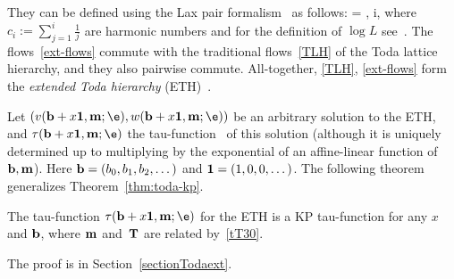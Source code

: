 They can be defined using the Lax pair formalism~\cite{CDZ} as follows:
\beq\label{ext-flows}
\e{} = , \qquad i,
\eeq
where $c_i:=\sum_{j=1}^i \frac1j$ are harmonic numbers and for the definition of $\log L$ see~\cite{CDZ, Milanov}.
The flows~\eqref{ext-flows} commute with the traditional flows~\eqref{TLH}
of the Toda lattice hierarchy, and they also pairwise commute.
All-together, \eqref{TLH}, \eqref{ext-flows} form the {\it extended Toda hierarchy} (ETH)~\cite{CDZ, Getzler, Zhang}.

Let $(v({\bf b}+x{\bf 1}, {\bf m}; \e), w({\bf b}+x{\bf 1}, {\bf m}; \e) )$ be an arbitrary solution
to the ETH, and $\tau({\bf b}+x{\bf 1},{\bf m}; \e)$ the tau-function~\cite{CDZ} of this solution
(although it is uniquely determined up to multiplying by
the exponential of an affine-linear function of ${\bf b}, {\bf m}$). %
Here ${\bf b}=(b_0,b_1,b_2,\dots)$ and ${\bf 1}=(1, 0, 0, \dots)$.
The following theorem
generalizes Theorem~\ref{thm:toda-kp}.
\begin{Theorem} \label{thm:toda-kp-ext}
The tau-function $\tau({\bf b}+x{\bf 1},{\bf m};\e)$ for the ETH
is a KP tau-function for any $x$ and ${\bf b}$, where ${\bf m}$ and~${\bf T}$ are related by~\eqref{tT30}.
\end{Theorem}
The proof is in Section~\ref{sectionTodaext}.
